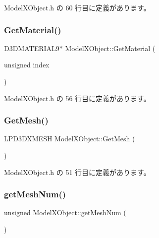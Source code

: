 Model\+X\+Object.\+h の 60 行目に定義があります。

\mbox{\label{class_model_x_object_a27df4304e87da11e2f9c9d7a8487a985}} 
\subsubsection{\texorpdfstring{Get\+Material()}{GetMaterial()}}
{\footnotesize\ttfamily D3\+D\+M\+A\+T\+E\+R\+I\+A\+L9$\ast$ Model\+X\+Object\+::\+Get\+Material (\begin{DoxyParamCaption}\item[{unsigned}]{index }\end{DoxyParamCaption})\hspace{0.3cm}{\ttfamily [inline]}}



 Model\+X\+Object.\+h の 56 行目に定義があります。

\mbox{\label{class_model_x_object_a3aaab083fe6e1956b2eaab815ebb4bfb}} 
\subsubsection{\texorpdfstring{Get\+Mesh()}{GetMesh()}}
{\footnotesize\ttfamily L\+P\+D3\+D\+X\+M\+E\+SH Model\+X\+Object\+::\+Get\+Mesh (\begin{DoxyParamCaption}{ }\end{DoxyParamCaption})\hspace{0.3cm}{\ttfamily [inline]}}



 Model\+X\+Object.\+h の 51 行目に定義があります。

\mbox{\label{class_model_x_object_a894790eda90cf0cc202b86f854583fda}} 
\subsubsection{\texorpdfstring{get\+Mesh\+Num()}{getMeshNum()}}
{\footnotesize\ttfamily unsigned Model\+X\+Object\+::get\+Mesh\+Num (\begin{DoxyParamCaption}{ }\end{DoxyParamCaption})\hspace{0.3cm}{\ttfamily [inline]}}



